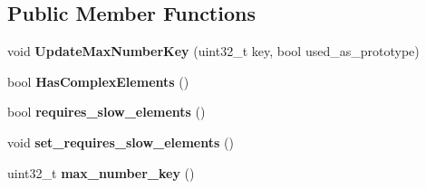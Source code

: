 \subsection*{Public Member Functions}
\begin{DoxyCompactItemize}
\item 
void {\bfseries Update\+Max\+Number\+Key} (uint32\+\_\+t key, bool used\+\_\+as\+\_\+prototype)\hypertarget{classv8_1_1internal_1_1_seeded_number_dictionary_a7168668e78794dc89ac1449b84835155}{}\label{classv8_1_1internal_1_1_seeded_number_dictionary_a7168668e78794dc89ac1449b84835155}

\item 
bool {\bfseries Has\+Complex\+Elements} ()\hypertarget{classv8_1_1internal_1_1_seeded_number_dictionary_a2d03bdce6ce51d6c61e0c8d31d8d2f56}{}\label{classv8_1_1internal_1_1_seeded_number_dictionary_a2d03bdce6ce51d6c61e0c8d31d8d2f56}

\item 
bool {\bfseries requires\+\_\+slow\+\_\+elements} ()\hypertarget{classv8_1_1internal_1_1_seeded_number_dictionary_a6a80262dbabab079434e9260e8c7a1eb}{}\label{classv8_1_1internal_1_1_seeded_number_dictionary_a6a80262dbabab079434e9260e8c7a1eb}

\item 
void {\bfseries set\+\_\+requires\+\_\+slow\+\_\+elements} ()\hypertarget{classv8_1_1internal_1_1_seeded_number_dictionary_a729972b015f11fc83ba6eb0efbd233ca}{}\label{classv8_1_1internal_1_1_seeded_number_dictionary_a729972b015f11fc83ba6eb0efbd233ca}

\item 
uint32\+\_\+t {\bfseries max\+\_\+number\+\_\+key} ()\hypertarget{classv8_1_1internal_1_1_seeded_number_dictionary_ab5445b91af5175746651684b44a4dd9f}{}\label{classv8_1_1internal_1_1_seeded_number_dictionary_ab5445b91af5175746651684b44a4dd9f}

\end{DoxyCompactItemize}
